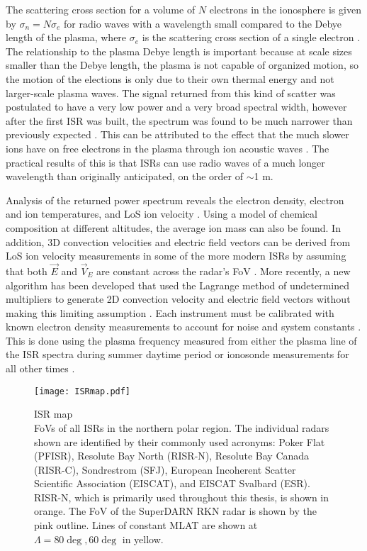 The scattering cross section for a volume of \(N\) electrons in the ionosphere is given by \(\sigma_n = N \sigma_e\) for radio waves with a wavelength small compared to the Debye length of the plasma, where \(\sigma_e\) is the scattering cross section of a single electron \citep{Gordon1958,Fejer1960}.  The relationship to the plasma Debye length is important because at scale sizes smaller than the Debye length, the plasma is not capable of organized motion, so the motion of the elections is only due to their own thermal energy and not larger-scale plasma waves.  The signal returned from this kind of scatter was postulated to have a very low power and a very broad spectral width, however after the first ISR was built, the spectrum was found to be much narrower than previously expected \citep{Evans1969}.  This can be attributed to the effect that the much slower ions have on free electrons in the plasma through ion acoustic waves \citep{Bowles1958}.  The practical results of this is that ISRs can use radio waves of a much longer wavelength than originally anticipated, on the order of \(\sim\)1 m.

Analysis of the returned power spectrum reveals the electron density, electron and ion temperatures, and LoS ion velocity \citep{Evans1969,Rishbeth1985,Nicolls2007a}.  Using a model of chemical composition at different altitudes, the average ion mass can also be found.  In addition, 3D convection velocities and electric field vectors can be derived from LoS ion velocity measurements in some of the more modern ISRs by assuming that both \(\vec{E}\) and \(\vec{V}_E\) are constant across the radar's FoV \citep{Heinselman2008}.  More recently, a new algorithm has been developed that used the Lagrange method of undetermined multipliers to generate 2D convection velocity and electric field vectors without making this limiting assumption \citep{Nicolls2014}.  Each instrument must be calibrated with known electron density measurements to account for noise and system constants \citep{Nicolls2007a}.  This is done using the plasma frequency measured from either the plasma line of the ISR spectra during summer daytime period or ionosonde measurements for all other times \citep{Bahcivan2010,Themens2014}.

\begin{figure}
	\centering
	\texttt{[image: ISRmap.pdf]}
	\caption[ISR map]{{\:}ISR map\\ FoVs of all ISRs in the northern polar region.  The individual radars shown are identified by their commonly used acronyms: Poker Flat (PFISR), Resolute Bay North (RISR-N), Resolute Bay Canada (RISR-C), Sondrestrom (SFJ), European Incoherent Scatter Scientific Association (EISCAT), and EISCAT Svalbard (ESR).  RISR-N, which is primarily used throughout this thesis, is shown in orange.  The FoV of the SuperDARN RKN radar is shown by the pink outline.  Lines of constant MLAT are shown at \(\Lambda=80\deg,60\deg\) in yellow.}
	\label{fig:isrmap}
\end{figure}


